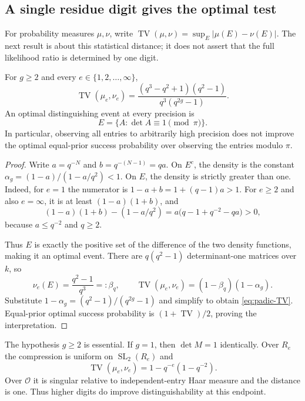 \subsection{A single residue digit gives the optimal test}

For probability measures $\mu,\nu$, write
$\operatorname{TV}(\mu,\nu)=\sup_E|\mu(E)-\nu(E)|$.
The next result is about this statistical distance; it does not assert
that the full likelihood ratio is determined by one digit.

\begin{theorem}
\label{thm:padic-TV}
For $g\geq2$ and every $e\in\{1,2,\ldots,\infty\}$,
\begin{equation}\label{eq:padic-TV}
 \operatorname{TV}(\mu_e,\nu_e)
 =\frac{(q^3-q^2+1)(q^2-1)}{q^3(q^{2g}-1)}.
\end{equation}
An optimal distinguishing event at every precision is
\begin{equation}\label{eq:padic-optimal-event}
 E=\{A:\det A\equiv1\pmod\pi\}.
\end{equation}
In particular, observing all entries to arbitrarily high precision
does not improve the optimal equal-prior success probability over
observing the entries modulo $\pi$.
\end{theorem}

\begin{proof}
Write $a=q^{-N}$ and $b=q^{-(N-1)}=qa$. On $E^c$, the density is the
constant $\alpha_g=(1-a)/(1-a/q^2)<1$. On $E$, the density is strictly
greater than one. Indeed, for $e=1$ the numerator is
$1-a+b=1+(q-1)a>1$. For $e\geq2$ and also $e=\infty$, it is at least
$(1-a)(1+b)$, and
\[
 (1-a)(1+b)-(1-a/q^2)
 =a\bigl(q-1+q^{-2}-qa\bigr)>0,
\]
because $a\leq q^{-2}$ and $q\geq2$.

Thus $E$ is exactly the positive set of the difference of the two
density functions, making it an optimal event. There are
$q(q^2-1)$ determinant-one matrices over $k$, so
\[
 \nu_e(E)=\frac{q^2-1}{q^3}=:\beta_q,
 \qquad
 \operatorname{TV}(\mu_e,\nu_e)
 =(1-\beta_q)(1-\alpha_g).
\]
Substitute
$1-\alpha_g=(q^2-1)/(q^{2g}-1)$ and simplify to obtain
\eqref{eq:padic-TV}. Equal-prior optimal success probability is
$(1+\operatorname{TV})/2$, proving the interpretation.
\end{proof}

\begin{remark}
The hypothesis $g\geq2$ is essential. If $g=1$, then $\det M=1$
identically. Over $R_e$ the compression is uniform on
$\operatorname{SL}_2(R_e)$ and
\[
 \operatorname{TV}(\mu_e,\nu_e)
 =1-q^{-e}(1-q^{-2}).
\]
Over $\mathcal O$ it is singular relative to independent-entry Haar
measure and the distance is one. Thus higher digits do improve
distinguishability at this endpoint.
\end{remark}

